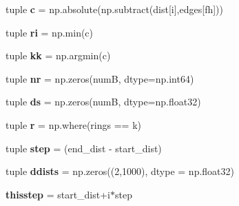 \begin{DoxyCompactItemize}
\item 
\hypertarget{classmyDetector_1_1myDetector_aaaff957ca93f9a4628cf9a71e2226485}{tuple {\bfseries c} = np.\-absolute(np.\-subtract(dist\mbox{[}i\mbox{]},edges\mbox{[}fh\mbox{]}))}\label{classmyDetector_1_1myDetector_aaaff957ca93f9a4628cf9a71e2226485}

\item 
\hypertarget{classmyDetector_1_1myDetector_a7f03237ffd1414c3a9bfeb1855d36526}{tuple {\bfseries ri} = np.\-min(c)}\label{classmyDetector_1_1myDetector_a7f03237ffd1414c3a9bfeb1855d36526}

\item 
\hypertarget{classmyDetector_1_1myDetector_ab950e9d57cb7264f512b678dd2798ecd}{tuple {\bfseries kk} = np.\-argmin(c)}\label{classmyDetector_1_1myDetector_ab950e9d57cb7264f512b678dd2798ecd}

\item 
\hypertarget{classmyDetector_1_1myDetector_a79dfa432d83e71f5e802b5aba8f36c54}{tuple {\bfseries nr} = np.\-zeros(num\-B, dtype=np.\-int64)}\label{classmyDetector_1_1myDetector_a79dfa432d83e71f5e802b5aba8f36c54}

\item 
\hypertarget{classmyDetector_1_1myDetector_a3424fbab3e6f4d576650c284eba38598}{tuple {\bfseries ds} = np.\-zeros(num\-B, dtype=np.\-float32)}\label{classmyDetector_1_1myDetector_a3424fbab3e6f4d576650c284eba38598}

\item 
\hypertarget{classmyDetector_1_1myDetector_a2c27b653c4286a72c86f4b79a3b941d1}{tuple {\bfseries r} = np.\-where(rings == k)}\label{classmyDetector_1_1myDetector_a2c27b653c4286a72c86f4b79a3b941d1}

\item 
\hypertarget{classmyDetector_1_1myDetector_ab1be8f48e86e8c9538c585b37c5e524e}{tuple {\bfseries step} = (end\-\_\-dist -\/ start\-\_\-dist)}\label{classmyDetector_1_1myDetector_ab1be8f48e86e8c9538c585b37c5e524e}

\item 
\hypertarget{classmyDetector_1_1myDetector_a126f9a763d1b24be4d664e2f5b839b8f}{tuple {\bfseries ddists} = np.\-zeros((2,1000), dtype = np.\-float32)}\label{classmyDetector_1_1myDetector_a126f9a763d1b24be4d664e2f5b839b8f}

\item 
\hypertarget{classmyDetector_1_1myDetector_aa75c5ea84928677e2d39cfba0b79dbb5}{{\bfseries thisstep} = start\-\_\-dist+i$\ast$step}\label{classmyDetector_1_1myDetector_aa75c5ea84928677e2d39cfba0b79dbb5}


\end{DoxyCompactItemize}
